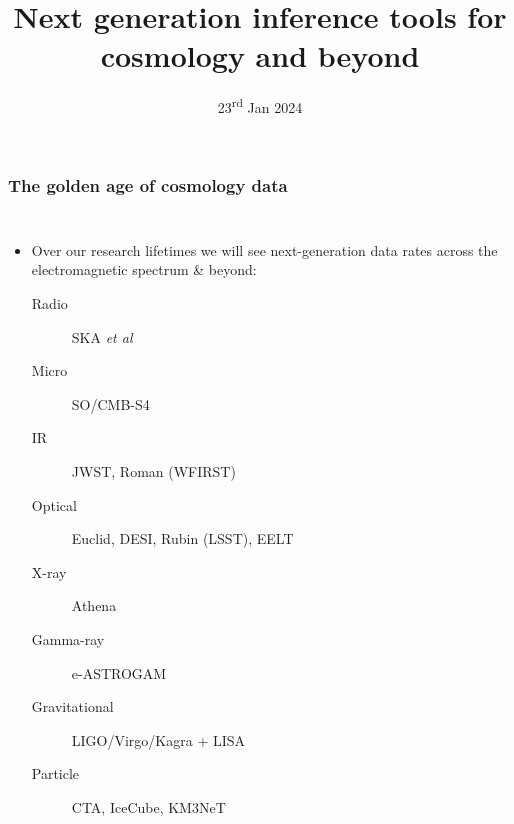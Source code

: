 \documentclass[aspectratio=169]{beamer}
\title{Next generation inference tools for cosmology and beyond}
\date{23\textsuperscript{rd} Jan 2024}
\begin{document}
\begin{frame}
    \titlepage
\end{frame}

\begin{frame}
    \frametitle{The golden age of cosmology data}
    \begin{columns}
        \begin{itemize}
            \item Over our research lifetimes we will see next-generation data rates across the electromagnetic spectrum \& beyond:
                \begin{description}
                    \item[Radio] SKA \textit{et al}
                    \item[Micro] SO/CMB-S4
                    \item[IR] JWST, Roman (WFIRST)
                    \item[Optical] Euclid, DESI, Rubin (LSST), EELT
                    \item[X-ray] Athena
                    \item[Gamma-ray] e-ASTROGAM
                    \item[Gravitational] LIGO/Virgo/Kagra + LISA
                    \item[Particle] CTA, IceCube, KM3NeT
                \end{description}
        \end{itemize}


\end{columns}
\end{frame}
\end{document}
